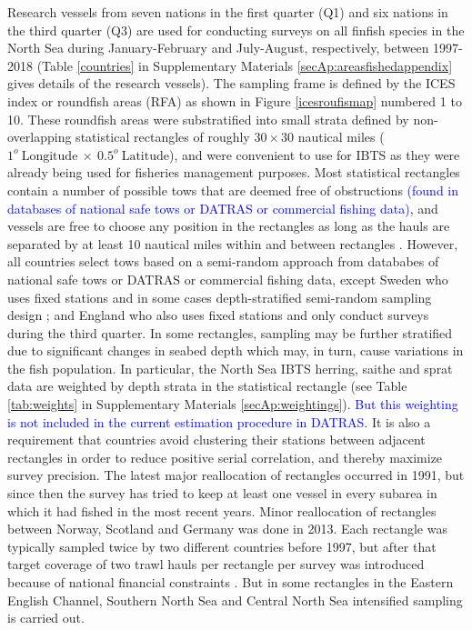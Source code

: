 \documentclass[a4paper 12pt]{article}
\numberwithin{equation}{section}
\newcommand{\nat}[1]{\textcolor{blue}{#1}}
\begin{document}
Research vessels from seven nations in the first quarter (Q1) and six nations in the third quarter (Q3) are used for conducting surveys on all finfish species in the North Sea during January-February and July-August, respectively, between 1997-2018 (Table \ref{countries} in Supplementary Materials \ref{secAp:areasfishedappendix} gives details of the research vessels). The sampling frame is defined by the ICES index or roundfish areas (RFA) as shown in Figure \ref{icesroufismap} numbered 1 to 10. These  roundfish areas were substratified into small strata defined by non-overlapping statistical rectangles of roughly $30 \times 30$ nautical miles ($1^{o} \  \mathrm{Longitude} \ \times  \  0.5^{o} \ \mathrm{Latitude}$), and were convenient to use for IBTS as they were already being used for fisheries management purposes. Most statistical rectangles contain a number of possible tows that are deemed free of obstructions \nat{(found in databases of national safe tows or DATRAS or commercial fishing data)}, and vessels are free to choose any position in the rectangles as long as the hauls are separated by at least 10 nautical miles within and between rectangles \citep{ICES2018}. However, all countries select tows based on a semi-random approach from datababes of national safe tows or DATRAS or commercial fishing data, except Sweden who uses fixed stations and in some cases depth-stratified semi-random sampling design \citep{ICES2018}; and England who also uses fixed stations and only conduct surveys during the third quarter. In some rectangles, sampling may be further stratified due to significant changes in seabed depth which may, in turn, cause variations in the fish population. In particular, the North Sea IBTS herring, saithe and sprat data are weighted by depth strata in the statistical rectangle (see Table \ref{tab:weights} in Supplementary Materials \ref{secAp:weightings}). \nat{But this weighting is not included in the current estimation procedure in DATRAS}. It is also a requirement that countries avoid clustering their stations between adjacent rectangles in order to reduce positive serial correlation, and thereby maximize survey precision.  The latest major reallocation of rectangles occurred in 1991, but since then the survey has tried to keep at least one vessel in every subarea in which it had fished in the most recent years. Minor reallocation of rectangles between Norway, Scotland and Germany was done in 2013. Each rectangle was  typically sampled twice by two different countries before 1997, but after that target coverage of two trawl hauls per rectangle per survey  was introduced because of national financial constraints \citep{ICES2015}. But in some rectangles in the Eastern English Channel, Southern North Sea and Central North Sea intensified sampling is carried out.\\
\end{document}
